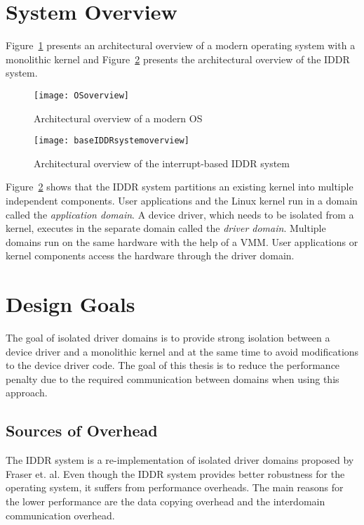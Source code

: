 \section{System Overview}\label{overview}

Figure~\ref{fig:monolithic} presents an architectural overview of a
modern operating system with a monolithic kernel and Figure~\ref{fig:base IDDR system overview} 
presents the architectural overview of the IDDR system.

\begin{figure}[!ht]
\centering
\texttt{[image: OSoverview]}
\caption{Architectural overview of a modern OS}
\label{fig:monolithic}
\end{figure}

\begin{figure}[!ht]
\centering
\texttt{[image: baseIDDRsystemoverview]}
\caption{Architectural overview of the interrupt-based IDDR system}
\label{fig:base IDDR system overview}
\end{figure}

Figure~\ref{fig:base IDDR system overview} shows that the IDDR
system partitions an existing kernel into multiple independent
components.  User applications and the Linux kernel run in a domain
called the \textit{application domain}. A device driver, which needs
to be isolated from a kernel, executes in the separate domain called
the \textit{driver domain}. Multiple domains run on the same hardware
with the help of a VMM. User applications or kernel components access
the hardware through the driver domain.

\section{Design Goals}\label{sec:goals}
The goal of isolated driver domains is to provide strong isolation
between a device driver and a monolithic kernel and at the same time to
avoid modifications to the device driver code. The goal of this thesis
is to reduce the performance penalty due to the required communication 
between domains when using this approach.

\subsection*{Sources of Overhead}
\label{subsec:overhead}
The IDDR system is a re-implementation of isolated driver domains proposed
by Fraser et. al. Even though the IDDR system provides better robustness
for the operating system, it suffers from performance overheads. The
main reasons for the lower performance are the data copying overhead
and the interdomain communication overhead.

